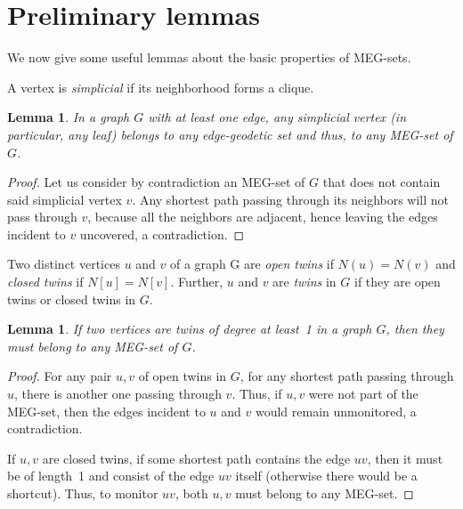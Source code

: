 \documentclass[10pt,a4paper]{article}
\newtheorem{lemma}[theorem]{Lemma}
\begin{document}
\section{Preliminary lemmas}\label{sec:prelim}

We now give some useful lemmas about the basic properties of MEG-sets.



A vertex is \emph{simplicial} if its neighborhood forms a clique.

\begin{lemma}\label{simplicial}\label{leaf-node}
In a graph $G$ with at least one edge, any simplicial vertex (in particular, any leaf) belongs to any edge-geodetic set and thus, to any MEG-set of $G$.
\end{lemma}
\begin{proof} Let us consider by contradiction an MEG-set of $G$ that does not contain said simplicial vertex $v$. Any shortest path passing through its neighbors will not pass through $v$, because all the neighbors are adjacent, hence leaving the edges incident to $v$ uncovered, a contradiction.
\end{proof}

Two distinct vertices $u$ and $v$ of a graph G are \emph{open twins} if $N(u) = N(v)$ and \emph{closed twins} if $N[u] = N[v]$. Further, $u$ and $v$ are \emph{twins} in $G$ if they are open twins or closed twins in $G$.

\begin{lemma}\label{twinv}
If two vertices are twins of degree at least~1 in a graph $G$, then they must belong to any MEG-set of $G$.
\end{lemma}
\begin{proof}
For any pair $u,v$ of open twins in $G$, for any shortest path passing through $u$, there is another one passing through $v$. Thus, if $u,v$ were not part of the MEG-set, then the edges incident to $u$ and $v$ would remain unmonitored, a contradiction.

If $u,v$ are closed twins, if some shortest path contains the edge $uv$, then it must be of length~1 and consist of the edge $uv$ itself (otherwise there would be a shortcut). Thus, to monitor $uv$, both $u,v$ must belong to any MEG-set.
\end{proof}
\end{document}
